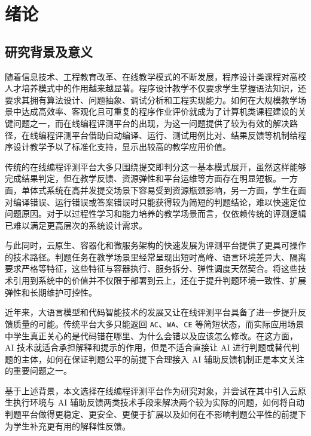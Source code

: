 \chapter{绪论}

\section{研究背景及意义}

随着信息技术、工程教育改革、在线教学模式的不断发展，程序设计类课程对高校人才培养模式中的作用越来越显著。程序设计教学不仅要求学生掌握语法知识，还要求其拥有算法设计、问题抽象、调试分析和工程实现能力。如何在大规模教学场景中达成高效率、客观化且可重复的程序作业评价就成为了计算机类课程建设的关键问题之一，而在线编程评测平台的出现，为这一问题提供了较为有效的解决路径，在线编程评测平台借助自动编译、运行、测试用例比对、结果反馈等机制给程序设计教学予以了标准化支持，显示出较高的教学应用价值\cite{kurnia2001online,leal2003mooshak,ala2005survey}。

传统的在线编程评测平台大多只围绕提交即判分这一基本模式展开，虽然这样能够完成结果判定，但在教学反馈、资源弹性和平台运维等方面存在明显短板。一方面，单体式系统在高并发提交场景下容易受到资源瓶颈影响，另一方面，学生在面对编译错误、运行错误或答案错误时只能获得较为简短的判题结论，难以快速定位问题原因。对于以过程性学习和能力培养的教学场景而言，仅依赖传统的评测逻辑已难以满足更高层次的系统设计需求\cite{ala2005survey,keuning2018feedback,barczak2023automated}。

与此同时，云原生、容器化和微服务架构的快速发展为评测平台提供了更具可操作的技术路径。判题任务在教学场景里经常呈现出短时高峰、语言环境差异大、隔离要求严格等特征，这些特征与容器执行、服务拆分、弹性调度天然契合\cite{burns2016borg,balalaie2016microservices,difrancesco2019microservices,hezhenwei2020kubernetes}。将这些技术引用到系统中的价值并不仅限于部署到云上，还在于提升判题环境一致性、扩展弹性和长期维护可控性。

近年来，大语言模型和代码智能技术的发展又让在线评测平台具备了进一步提升反馈质量的可能。传统平台大多只能返回 \texttt{AC}、\texttt{WA}、\texttt{CE} 等简短状态，而实际应用场景中学生真正关心的是代码错在哪里、为什么会错以及应该怎么修改。在这方面，AI 技术就适合承担解释和提示的作用，但是不适合直接让 AI 进行判题或替代判题的主体\cite{keuning2018feedback,sarsa2022llm,jacobs2024feedback,wangfang2023ai,zhanghongzhuo2024genai}，如何在保证判题公平的前提下合理接入 AI 辅助反馈机制正是本文关注的重要问题之一。

基于上述背景，本文选择在线编程评测平台作为研究对象，并尝试在其中引入云原生执行环境与 AI 辅助反馈两类技术手段来解决两个较为实际的问题，如何将自动判题平台做得更稳定、更安全、更便于扩展以及如何在不影响判题公平性的前提下为学生补充更有用的解释性反馈。

